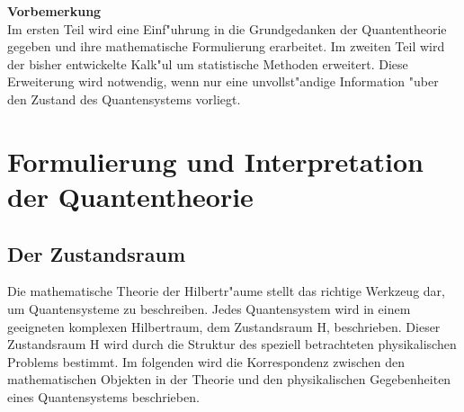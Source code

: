 \newcommand{\scalar}[3]{\left< #1 | #2 | #3 \right>}
\newcommand{\betrag}[1]{\left| #1 \right|}
\newcommand{\norm}[1]{\| #1\|}
\newcommand{\raum}{H}
\newcommand{\quadr}[1]{\left( #1 \right) ^2}
\newcommand{\menge}[1]{\left\{ #1 \right\}}
\newcommand{\scalars}[2]{\left< #1 | #2 \right>}
\newcommand{\tscalars}[6]{ \left< #1 #3 | #2 #4 \right>_{#5 , #6} }
\newcommand{\Ima}{\mbox{Im}}
\newcommand{\Spur}[1]{\mbox{Sp} \left( #1\right)}
\newcommand{\Proj}[1]{\ket{#1}\bra{#1}}
\newcommand{\Prob}[2]{{\cal P}_{#1} \left( #2 \right)}
\newcommand{\bra}[1]{\left< #1 \right|}
\newcommand{\ket}[1]{\left| #1 \right>}
\newcommand{\tbra}[2]{\left< #1 \right|_{#2}}
\newcommand{\tket}[2]{\left| #1 \right>_{#2}}
\newcommand{\mean}[1]{\left< #1 \right>}
\newcommand{\var}[1]{\left( \triangle \left< #1 \right> \right)^2}
\newcommand{\unscharf}[1]{ \triangle \left< #1 \right>}
\newcommand{\id}{\hbox{\small1\kern-3.8pt\normalsize1}}
\newcommand{\difft}{{\partial \over \partial t}}
\newcommand{\kommutator}[2]{\left[ #1 , #2 \right]}
\newcommand{\Hamilton}{{\cal H}}
\newcommand{\Poisson}[2]{\lbrace #1 , #2 \rbrace}
\newcommand{\tupel}[1]{\left( #1 \right)}

{\bf Vorbemerkung} \\
Im ersten Teil wird eine Einf"uhrung in die Grundgedanken der Quantentheorie gegeben und ihre mathematische Formulierung erarbeitet. Im zweiten Teil wird der
bisher entwickelte Kalk"ul um statistische Methoden erweitert. Diese Erweiterung wird notwendig, wenn nur eine unvollst"andige Information "uber den Zustand des
Quantensystems vorliegt. 

\section{Formulierung und Interpretation der Quantentheorie}
  \subsection{Der Zustandsraum}
    Die mathematische Theorie der Hilbertr"aume stellt das richtige Werkzeug dar, um Quantensysteme zu beschreiben. Jedes Quantensystem wird in einem geeigneten
    komplexen Hilbertraum, dem Zustandsraum \raum, beschrieben. Dieser Zustandsraum \raum{} wird durch die Struktur des speziell betrachteten physikalischen Problems
    bestimmt. Im folgenden wird die Korrespondenz zwischen den mathematischen Objekten in der Theorie und den physikalischen Gegebenheiten eines Quantensystems 
    beschrieben.
    
